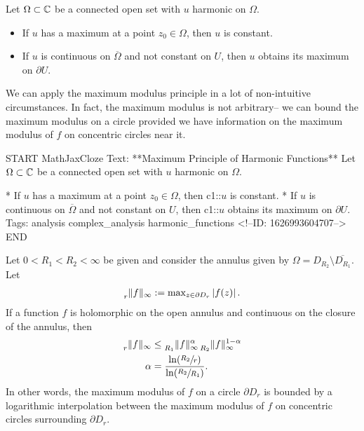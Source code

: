 \documentclass{memoir}
\begin{document}
\begin{thm}
	Let \(\Omega \subset \mathbb{C}\) be a connected open set with \(u\) harmonic on \(\Omega \).
\begin{itemize}
	\item If \(u\) has a maximum at a point \(z_0 \in \Omega \), then \(u\) is constant.
	\item If \(u\) is continuous on \(\overline{\Omega }\) and not constant on \(U\), then \(u\) obtains its maximum on \(\partial U\).
\end{itemize}
\end{thm}

We can apply the maximum modulus principle in a lot of non-intuitive circumstances. In fact, the maximum modulus is not arbitrary-- we can bound the maximum modulus on a circle provided we have information on the maximum modulus of \(f\) on concentric circles near it.

\begin{anki}
START
MathJaxCloze
Text: **Maximum Principle of Harmonic Functions**
Let \(\Omega \subset \mathbb{C}\) be a connected open set with \(u\) harmonic on \(\Omega \).

* If \(u\) has a maximum at a point \(z_0 \in \Omega \), then {{c1::\(u\) is constant}}.
* If \(u\) is continuous on \(\overline{\Omega }\) and not constant on \(U\), then {{c1::\(u\) obtains its maximum on \(\partial U\)}}.
Tags: analysis complex_analysis harmonic_functions
<!--ID: 1626993604707-->
END
\end{anki}

\begin{thm}
	Let \(0<R_1<R_2<\infty\) be given and consider the annulus given by \(\Omega = D_{R_2} \setminus \overline{D_{R_1}}\). Let
	\begin{align*}
		\prescript{}{r}\|f\|_\infty := \textrm{max}_{z \in \partial D_r} \left| f(z) \right| .
	\end{align*}
	If a function \(f\) is holomorphic on the open annulus and continuous on the closure of the annulus, then
	\begin{align*}
		\prescript{}{r}\|f\|_{\infty} &\leq \prescript{}{R_1}\|f\|_{\infty}^{\alpha } \prescript{}{R_2}\|f\|_{\infty}^{1-\alpha }\\
		\alpha &= \frac{\ln(\sfrac{R_2}{r})}{\ln(\sfrac{R_2}{R_1})}.
	\end{align*}
	In other words, the maximum modulus of \(f\) on a circle \(\partial D_r\) is bounded by a logarithmic interpolation between the maximum modulus of \(f\) on concentric circles surrounding \(\partial D_r\).
\end{thm}
\end{document}
